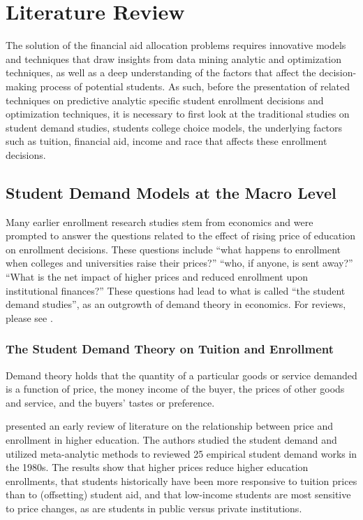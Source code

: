 \documentclass[12pt,english]{report}
\begin{document}
\chapter{Literature Review}
The solution of the financial aid allocation problems requires innovative
models and techniques that draw insights from data mining analytic and
optimization techniques, as well as a deep understanding of the factors that
affect the decision-making process of potential students.  As such, before the
presentation of related techniques on predictive  analytic specific student
enrollment decisions and  optimization techniques, it is necessary to first
look at the traditional studies on student demand studies, students college
choice models, the underlying factors such as tuition, financial aid, income
and race that affects these enrollment decisions.

\section{Student Demand Models at the Macro Level }
Many earlier enrollment research studies stem from economics and were prompted
to answer the questions related to the effect of rising price of education on
enrollment decisions. These questions include  ``what happens to enrollment
when colleges and universities raise their prices?''  ``who, if anyone, is sent
away?''  ``What is the net impact of higher prices and reduced enrollment upon
institutional finances?''  These questions had lead to what is called ``the
student demand studies'', as an outgrowth of demand theory in economics.   For
reviews, please see \citep{Leslie1987,  Leslie1988, Heller1997, Ehrenberg2004,
Crouse2015}.

\subsection{The Student Demand Theory on Tuition and Enrollment}
Demand theory holds that the quantity of a particular goods or service demanded
is a function of price, the money income of the buyer, the prices of other
goods and service, and the buyers' tastes or preference.

\citet{Leslie1987} presented an early review of literature on the relationship
between price and enrollment in higher education. The authors studied the
student demand and utilized meta-analytic methods to reviewed 25 empirical
student demand works in the 1980s. The results show that higher prices reduce
higher education enrollments, that students historically have been more
responsive to tuition prices than to (offsetting) student aid, and that
low-income students are most sensitive to price changes, as are students in
public versus private institutions.
\end{document}
